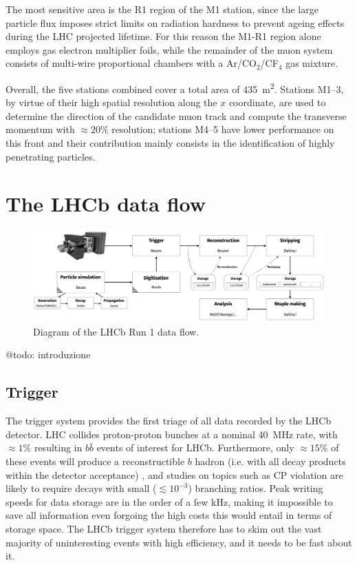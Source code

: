 The most sensitive area is the R1 region of the M1 station, since the large particle flux imposes strict limits on radiation hardness to prevent ageing effects during the LHC projected lifetime.
For this reason the M1-R1 region alone employs gas electron multiplier foils, while the remainder of the muon system consists of multi-wire proportional chambers with a Ar/CO$_2$/CF$_4$ gas mixture.

Overall, the five stations combined cover a total area of \SI{435}{\meter\squared}. Stations M1--3, by virtue of their high spatial resolution along the $x$ coordinate, are used to determine the direction of the candidate muon track and compute the transverse momentum with $\approx 20\%$ resolution;
stations M4--5 have lower performance on this front and their contribution mainly consists in the identification of highly penetrating particles.

\section{The LHCb data flow}
\label{sec:2:data_flow}

\begin{figure}[t]
	\centering
	\includegraphics[width=\textwidth]{graphics/02-lhcb/lhcb_run_1_data_flow.png}
	\caption{Diagram of the LHCb Run 1 data flow.}
	\label{fig:2:lhcb_data_flow}
\end{figure}


@todo: introduzione

\subsection{Trigger}
The trigger system \cite{Antunes-Nobrega:630828} provides the first triage of all data recorded by the LHCb detector.
LHC collides proton-proton bunches at a nominal \SI{40}{\mega\hertz} rate, with $\approx 1\%$ resulting in $b\bar{b}$ events of interest for LHCb.
Furthermore, only $\approx 15\%$ of these events will produce a reconstructible $b$ hadron (i.e. with all decay products within the detector acceptance) \cite{HistoryLHCb}, and studies on topics such as CP violation are likely to require decays with small ($\lesssim {10}^{-3}$) branching ratios.
Peak writing speeds for data storage are in the order of a few \si{\kilo\hertz}, making it impossible to save all information even forgoing the high costs this would entail in terms of storage space.
The LHCb trigger system therefore has to skim out the vast majority of uninteresting events with high efficiency, and it needs to be fast about it.

